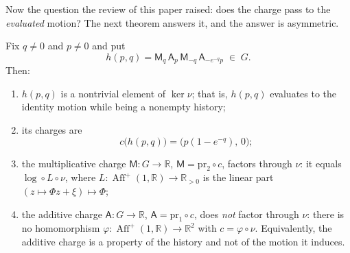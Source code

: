 Now the question the review of this paper raised: does the charge pass to the
\emph{evaluated} motion?  The next theorem answers it, and the answer is asymmetric.

\begin{theorem}
\label{thm:p0-descent}
Fix $q\ne0$ and $p\ne0$ and put
\begin{equation}\label{eq:p0-transport-element}
  h(p,q)=\mathsf M_q\,\mathsf A_p\,\mathsf M_{-q}\,\mathsf A_{-e^{-q}p}
  \;\in\; G .
\end{equation}
Then:
\begin{enumerate}
  \item $h(p,q)$ is a nontrivial element of $\ker\nu$; that is,
  $h(p,q)$ evaluates to the identity motion while being a nonempty history;
  \item its charges are
  \[
    c\bigl(h(p,q)\bigr)=\bigl(p(1-e^{-q}),\,0\bigr);
  \]
  \item the multiplicative charge $\mathsf M:G\to\mathbb R$,
  $\mathsf M=\mathrm{pr}_2\circ c$, factors through $\nu$: it equals
  $\log\circ L\circ\nu$, where $L:\operatorname{Aff}^{+}(1,\mathbb R)\to
  \mathbb R_{>0}$ is the linear part $(z\mapsto \Phi z+\xi)\mapsto\Phi$;
  \item the additive charge $\mathsf A:G\to\mathbb R$,
  $\mathsf A=\mathrm{pr}_1\circ c$, does \emph{not} factor through $\nu$: there is no
  homomorphism $\varphi:\operatorname{Aff}^{+}(1,\mathbb R)\to\mathbb R^2$ with
  $c=\varphi\circ\nu$.  Equivalently, the additive charge is a property of the
  history and not of the motion it induces.
\end{enumerate}
\end{theorem}


